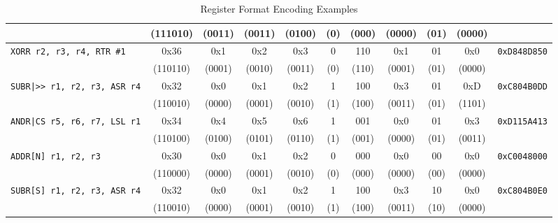 \begin{table}[H]
\begin{tabular}{lcccccccccc}
		                                    & (111010)    & (0011)      & (0011)      & (0100)      & (0)         & (000)       & (0000)      & (01)        & (0000)        &                     \\
		\midrule
		\texttt{XORR r2, r3, r4, RTR \#1}   & 0x36        & 0x1         & 0x2         & 0x3         & 0           & 110         & 0x1         & 01          & 0x0           & \texttt{0xD848D850} \\
		                                    & (110110)    & (0001)      & (0010)      & (0011)      & (0)         & (110)       & (0001)      & (01)        & (0000)        &                     \\
		\midrule
		\texttt{SUBR|>> r1, r2, r3, ASR r4} & 0x32        & 0x0         & 0x1         & 0x2         & 1           & 100         & 0x3         & 01          & 0xD           & \texttt{0xC804B0DD} \\
		                                    & (110010)    & (0000)      & (0001)      & (0010)      & (1)         & (100)       & (0011)      & (01)        & (1101)        &                     \\
		\midrule
		\texttt{ANDR|CS r5, r6, r7, LSL r1} & 0x34        & 0x4         & 0x5         & 0x6         & 1           & 001         & 0x0         & 01          & 0x3           & \texttt{0xD115A413} \\
		                                    & (110100)    & (0100)      & (0101)      & (0110)      & (1)         & (001)       & (0000)      & (01)        & (0011)        &                     \\
		\midrule
		\texttt{ADDR[N] r1, r2, r3}         & 0x30        & 0x0         & 0x1         & 0x2         & 0           & 000         & 0x0         & 00          & 0x0           & \texttt{0xC0048000} \\
		                                    & (110000)    & (0000)      & (0001)      & (0010)      & (0)         & (000)       & (0000)      & (00)        & (0000)        &                     \\
		\midrule
		\texttt{SUBR[S] r1, r2, r3, ASR r4} & 0x32        & 0x0         & 0x1         & 0x2         & 1           & 100         & 0x3         & 10          & 0x0           & \texttt{0xC804B0E0} \\
		                                    & (110010)    & (0000)      & (0001)      & (0010)      & (1)         & (100)       & (0011)      & (10)        & (0000)        &                     \\
		\bottomrule
	\end{tabular}
	\caption{Register Format Encoding Examples}
	\label{tab:register-format-examples}
\end{table}
